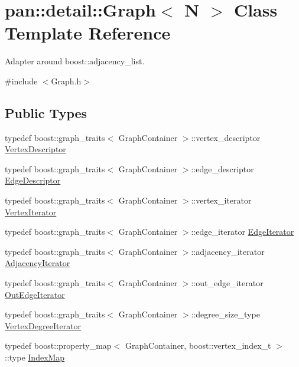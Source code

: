 \hypertarget{classpan_1_1detail_1_1_graph}{}\section{pan\+:\+:detail\+:\+:Graph$<$ N $>$ Class Template Reference}
\label{classpan_1_1detail_1_1_graph}


Adapter around boost\+::adjacency\+\_\+list.  




{\ttfamily \#include $<$Graph.\+h$>$}

\subsection*{Public Types}
\begin{DoxyCompactItemize}
\item 
typedef boost\+::graph\+\_\+traits$<$ Graph\+Container $>$\+::vertex\+\_\+descriptor \hyperlink{classpan_1_1detail_1_1_graph_a462f566d2f6cb0e51c85c8e9fa5382ab}{Vertex\+Descriptor}
\item 
typedef boost\+::graph\+\_\+traits$<$ Graph\+Container $>$\+::edge\+\_\+descriptor \hyperlink{classpan_1_1detail_1_1_graph_a21d6fe3d33512e98e8578df1f4d8b810}{Edge\+Descriptor}
\item 
typedef boost\+::graph\+\_\+traits$<$ Graph\+Container $>$\+::vertex\+\_\+iterator \hyperlink{classpan_1_1detail_1_1_graph_a70f42d6ae8c952de395c7fe665182e5c}{Vertex\+Iterator}
\item 
typedef boost\+::graph\+\_\+traits$<$ Graph\+Container $>$\+::edge\+\_\+iterator \hyperlink{classpan_1_1detail_1_1_graph_abf1033eeaf577f4c099f3e56164a0439}{Edge\+Iterator}
\item 
typedef boost\+::graph\+\_\+traits$<$ Graph\+Container $>$\+::adjacency\+\_\+iterator \hyperlink{classpan_1_1detail_1_1_graph_a3cec4963078d7a19e05fbd038525ac17}{Adjacency\+Iterator}
\item 
typedef boost\+::graph\+\_\+traits$<$ Graph\+Container $>$\+::out\+\_\+edge\+\_\+iterator \hyperlink{classpan_1_1detail_1_1_graph_ab020b117f26b3d19039491ecb5ff5130}{Out\+Edge\+Iterator}
\item 
typedef boost\+::graph\+\_\+traits$<$ Graph\+Container $>$\+::degree\+\_\+size\+\_\+type \hyperlink{classpan_1_1detail_1_1_graph_a4f48579e58569a6607cdc95f80a001ea}{Vertex\+Degree\+Iterator}
\item 
typedef boost\+::property\+\_\+map$<$ Graph\+Container, boost\+::vertex\+\_\+index\+\_\+t $>$\+::type \hyperlink{classpan_1_1detail_1_1_graph_a5c24f583c13faceb000758f24389728c}{Index\+Map}

\end{DoxyCompactItemize}
